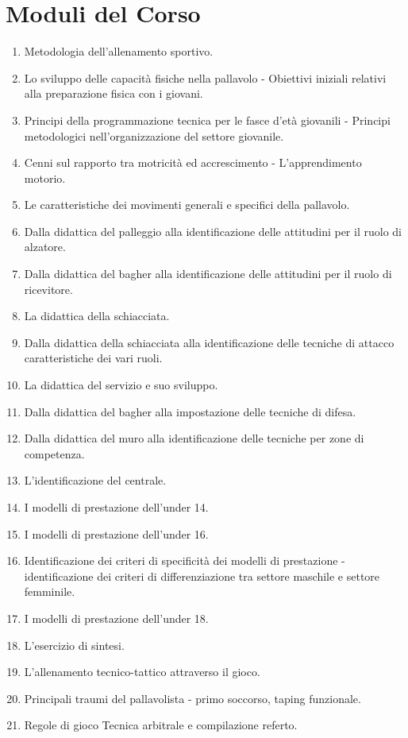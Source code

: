 \chapter*{Moduli del Corso}

\begin{enumerate}
\item Metodologia dell’allenamento sportivo.
\item Lo sviluppo delle capacità fisiche nella pallavolo - Obiettivi iniziali relativi alla preparazione fisica con i giovani.
\item Principi della programmazione tecnica per le fasce d'età giovanili - Principi metodologici nell'organizzazione del settore giovanile.
\item Cenni sul rapporto tra motricità ed accrescimento - L'apprendimento motorio.
\item Le caratteristiche dei movimenti generali e specifici della pallavolo.
\item Dalla didattica del palleggio alla identificazione delle attitudini per il ruolo di alzatore.
\item Dalla didattica del bagher alla identificazione delle attitudini per il ruolo di ricevitore.
\item La didattica della schiacciata.
\item Dalla didattica della schiacciata alla identificazione delle tecniche di attacco caratteristiche dei vari ruoli.
\item La didattica del servizio e suo sviluppo.
\item Dalla didattica del bagher alla impostazione delle tecniche di difesa.
\item Dalla didattica del muro alla identificazione delle tecniche per zone di competenza.
\item L'identificazione del centrale.
\item I modelli di prestazione dell'under 14.
\item I modelli di prestazione dell'under 16.
\item Identificazione dei criteri di specificità dei modelli di prestazione - identificazione dei criteri di differenziazione tra settore maschile e settore femminile.
\item I modelli di prestazione dell'under 18.
\item L'esercizio di sintesi.
\item L'allenamento tecnico-tattico attraverso il gioco.
\item Principali traumi del pallavolista - primo soccorso, taping funzionale.
\item Regole di gioco Tecnica arbitrale e compilazione referto.
\end{enumerate}